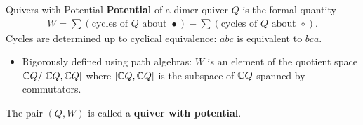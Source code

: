 \begin{frame}{Quivers with Potential}
    \textbf{Potential} of a dimer quiver $Q$ is the formal quantity
    \begin{align*}
        W = \sum (\text{cycles of } Q \text{ about } \bullet) - \sum (\text{cycles of } Q \text{ about } \circ).
    \end{align*}
    Cycles are determined up to cyclical equivalence: $abc$ is equivalent to $bca$.
    \begin{itemize}
        \justifying
        \item Rigorously defined using path algebras: $W$ is an element of the quotient space $\mathbb{C} Q/[\mathbb{C} Q, \mathbb{C} Q]$ where $[\mathbb{C} Q, \mathbb{C} Q]$ is the subspace of $\mathbb{C} Q$ spanned by commutators.
    \end{itemize}
    The pair $(Q, W)$ is called a \textbf{quiver with potential}.
\end{frame}

